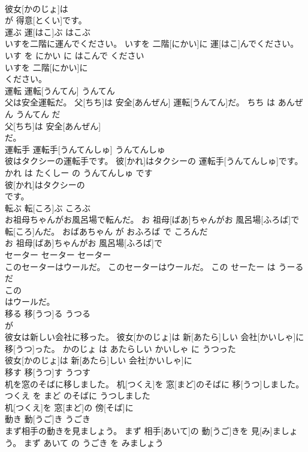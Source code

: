 \documentclass[8pt]{extreport}
\begin{document}
\begin{CJK}{UTF8}{min}
\\	彼女[かのじょ]は
\\	が 得意[とくい]です。		
\\	運ぶ	運[はこ]ぶ	はこぶ	
\\	いすを二階に運んでください。	いすを 二階[にかい]に 運[はこ]んでください。	いす を にかい に はこんで ください	
\\	いすを 二階[にかい]に
\\	ください。		
\\	運転	運転[うんてん]	うんてん	
\\	父は安全運転だ。	父[ちち]は 安全[あんぜん] 運転[うんてん]だ。	ちち は あんぜん うんてん だ	
\\	父[ちち]は 安全[あんぜん]
\\	だ。		
\\	運転手	運転手[うんてんしゅ]	うんてんしゅ	
\\	彼はタクシーの運転手です。	彼[かれ]はタクシーの 運転手[うんてんしゅ]です。	かれ は たくしー の うんてんしゅ です	
\\	彼[かれ]はタクシーの
\\	です。		
\\	転ぶ	転[ころ]ぶ	ころぶ	
\\	お祖母ちゃんがお風呂場で転んだ。	お 祖母[ばあ]ちゃんがお 風呂場[ふろば]で 転[ころ]んだ。	おばあちゃん が おふろば で ころんだ	
\\	お 祖母[ばあ]ちゃんがお 風呂場[ふろば]で
\\	セーター	セーター	セーター	
\\	このセーターはウールだ。	このセーターはウールだ。	この せーたー は うーる だ	
\\	この
\\	はウールだ。		
\\	移る	移[うつ]る	うつる	
\\	が		
\\	彼女は新しい会社に移った。	彼女[かのじょ]は 新[あたら]しい 会社[かいしゃ]に 移[うつ]った。	かのじょ は あたらしい かいしゃ に うつった	
\\	彼女[かのじょ]は 新[あたら]しい 会社[かいしゃ]に
\\	移す	移[うつ]す	うつす	
\\	机を窓のそばに移しました。	机[つくえ]を 窓[まど]のそばに 移[うつ]しました。	つくえ を まど のそばに うつしました	
\\	机[つくえ]を 窓[まど]の 傍[そば]に
\\	動き	動[うご]き	うごき	
\\	まず相手の動きを見ましょう。	まず 相手[あいて]の 動[うご]きを 見[み]ましょう。	まず あいて の うごき を みましょう	

\end{CJK}
\end{document}
